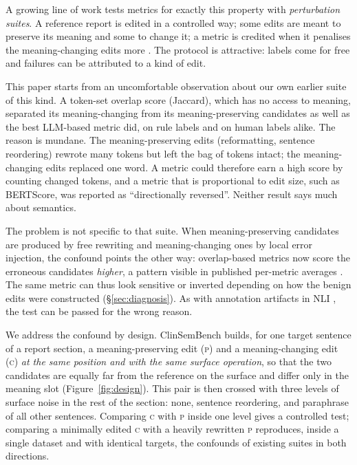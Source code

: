 \documentclass[11pt]{article}
\newcommand{\bench}{ClinSemBench\xspace}
\newcommand{\Pc}{\textsc{p}\xspace}
\newcommand{\Cc}{\textsc{c}\xspace}
\begin{document}
A growing line of work tests metrics for exactly this property with \emph{perturbation suites}.
A reference report is edited in a controlled way; some edits are meant to preserve its meaning and some to change it; a metric is credited when it penalises the meaning-changing edits more \citep{sai-etal-2021-perturbation,ribeiro-etal-2020-beyond,reevalmed-2025,radsem-2026}.
The protocol is attractive: labels come for free and failures can be attributed to a kind of edit.

This paper starts from an uncomfortable observation about our own earlier suite of this kind.
A token-set overlap score (Jaccard), which has no access to meaning, separated its meaning-changing from its meaning-preserving candidates as well as the best LLM-based metric did, on rule labels and on human labels alike.
The reason is mundane.
The meaning-preserving edits (reformatting, sentence reordering) rewrote many tokens but left the bag of tokens intact; the meaning-changing edits replaced one word.
A metric could therefore earn a high score by counting changed tokens, and a metric that is proportional to edit size, such as BERTScore, was reported as ``directionally reversed''.
Neither result says much about semantics.

The problem is not specific to that suite.
When meaning-preserving candidates are produced by free rewriting and meaning-changing ones by local error injection, the confound points the other way: overlap-based metrics now score the erroneous candidates \emph{higher}, a pattern visible in published per-metric averages \citep{reevalmed-2025}.
The same metric can thus look sensitive or inverted depending on how the benign edits were constructed (\S\ref{sec:diagnosis}).
As with annotation artifacts in NLI \citep{gururangan-etal-2018-annotation,mccoy-etal-2019-right}, the test can be passed for the wrong reason.

We address the confound by design.
\bench builds, for one target sentence of a report section, a meaning-preserving edit (\Pc) and a meaning-changing edit (\Cc) \emph{at the same position and with the same surface operation}, so that the two candidates are equally far from the reference on the surface and differ only in the meaning slot (Figure~\ref{fig:design}).
This pair is then crossed with three levels of surface noise in the rest of the section: none, sentence reordering, and paraphrase of all other sentences.
Comparing \Cc with \Pc inside one level gives a controlled test; comparing a minimally edited \Cc with a heavily rewritten \Pc reproduces, inside a single dataset and with identical targets, the confounds of existing suites in both directions.
\end{document}
